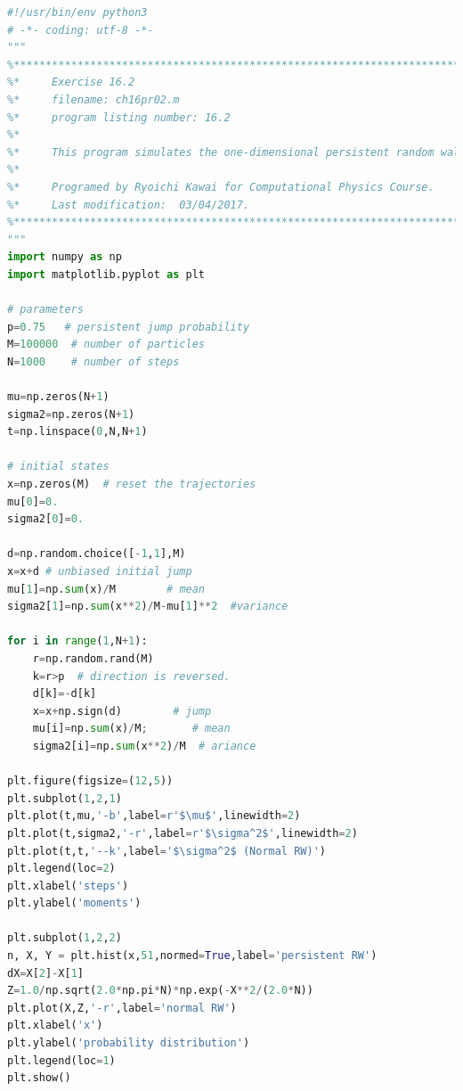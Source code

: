 \bigskip
\noindent
\program
\footnotesize
\begin{lstlisting}[language=python]
#!/usr/bin/env python3
# -*- coding: utf-8 -*-
"""
%**************************************************************************
%*     Exercise 16.2                                                      *
%*     filename: ch16pr02.m                                               *
%*     program listing number: 16.2                                       *
%*                                                                        *
%*     This program simulates the one-dimensional persistent random walk. *
%*                                                                        *
%*     Programed by Ryoichi Kawai for Computational Physics Course.       *
%*     Last modification:  03/04/2017.                                    *
%**************************************************************************
"""
import numpy as np
import matplotlib.pyplot as plt

# parameters
p=0.75   # persistent jump probability
M=100000  # number of particles
N=1000    # number of steps

mu=np.zeros(N+1)
sigma2=np.zeros(N+1)
t=np.linspace(0,N,N+1)

# initial states
x=np.zeros(M)  # reset the trajectories
mu[0]=0.
sigma2[0]=0.

d=np.random.choice([-1,1],M)
x=x+d # unbiased initial jump
mu[1]=np.sum(x)/M        # mean
sigma2[1]=np.sum(x**2)/M-mu[1]**2  #variance

for i in range(1,N+1):
    r=np.random.rand(M)
    k=r>p  # direction is reversed.
    d[k]=-d[k]
    x=x+np.sign(d)        # jump
    mu[i]=np.sum(x)/M;       # mean
    sigma2[i]=np.sum(x**2)/M  # ariance

plt.figure(figsize=(12,5))
plt.subplot(1,2,1)
plt.plot(t,mu,'-b',label=r'$\mu$',linewidth=2)
plt.plot(t,sigma2,'-r',label=r'$\sigma^2$',linewidth=2)
plt.plot(t,t,'--k',label='$\sigma^2$ (Normal RW)')
plt.legend(loc=2)
plt.xlabel('steps')
plt.ylabel('moments')

plt.subplot(1,2,2)
n, X, Y = plt.hist(x,51,normed=True,label='persistent RW')
dX=X[2]-X[1]
Z=1.0/np.sqrt(2.0*np.pi*N)*np.exp(-X**2/(2.0*N))
plt.plot(X,Z,'-r',label='normal RW')
plt.xlabel('x')
plt.ylabel('probability distribution')
plt.legend(loc=1)
plt.show()
\end{lstlisting}
\normalsize

